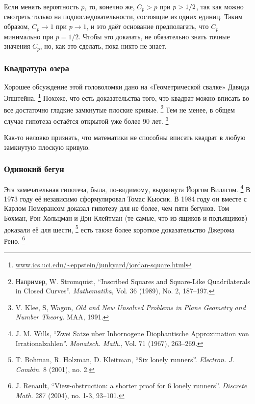 Если менять вероятность $p$, то, конечно же, $C_p>p$ при $p \z> 1/2$, так как можно смотреть только на подпоследовательности, состоящие из одних единиц.
Таким образом, $C_p\to 1$ при $p\to 1$, и это даёт основание предполагать, что $C_p$ минимально при $p=1/2$.
Чтобы это доказать, не обязательно знать точные значения $C_p$,
но, как это сделать, пока никто не знает.

\subsubsection*{Квадратура озера}

Хорошее обсуждение этой головоломки дано на «Геометрической свалке» Давида Эпштейна.%
\footnote{\href{http://www.ics.uci.edu/~eppstein/junkyard/jordan-square.html}{\url{www.ics.uci.edu/~eppstein/junkyard/jordan-square.html}}}
Похоже, что есть доказательства того, что квадрат можно вписать во все достаточно гладкие замкнутые плоские кривые.%
\footnote{Например, W. Stromquist, ``Inscribed Squares and Square-Like Quadrilaterals in Closed Curves''. \emph{Mathematika}, Vol. 36 (1989), No. 2, 187--197.}
Тем не менее, в общем случае гипотеза остаётся открытой уже более 90 лет.%
\footnote{V. Klee, S, Wagon, \emph{Old and New Unsolved Problems in Plane Geometry and Number Theory.} MAA, 1991.}

\medskip

Как-то неловко признать, что математики не способны вписать квадрат в любую замкнутую плоскую кривую.

\subsubsection*{Одинокий бегун}

{

\sloppy

Эта замечательная гипотеза, была, по-видимому, выдвинута Йоргом Виллсом.%
\footnote{J. M. Wills, ``Zwei Satze uber Inhornogene Diophantische Approximation von Irrationalzahlen''. \emph{Monatsch. Math.}, Vol. 71 (1967), 263--269.}
В 1973 году её независимо сформулировал Томас Кьюсик.
В 1984 году он вместе с Карлом Померансом доказал гипотезу для не более, чем пяти бегунов.
Том Бохман, Рон Хольцман и Дэн Клейтман (те самые, что из ящиков и подъящиков) доказали её для шести,%
\footnote{T. Bohman, R. Holzman, D. Kleitman,
``Six lonely runners''.
\emph{Electron. J. Combin.} 8 (2001), no. 2.
}
есть также более короткое доказательство Джерома Рено.%
\footnote{J. Renault, ``View-obstruction: a shorter proof for 6 lonely runners''. \emph{Discrete Math.} 287 (2004), no. 1-3, 93--101.}

}

